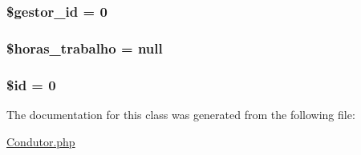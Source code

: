 \subsubsection[{\$gestor\+\_\+id}]{\setlength{\rightskip}{0pt plus 5cm}\$gestor\+\_\+id = 0}\label{class_condutor_a0a417a750596945da402317f18bc0d1c}
\hypertarget{class_condutor_aacf4107d2082c24e18c17ecdb542c16a}{}
\subsubsection[{\$horas\+\_\+trabalho}]{\setlength{\rightskip}{0pt plus 5cm}\${\bf horas\+\_\+trabalho} = null}\label{class_condutor_aacf4107d2082c24e18c17ecdb542c16a}
\hypertarget{class_condutor_ae97941710d863131c700f069b109991e}{}
\subsubsection[{\$id}]{\setlength{\rightskip}{0pt plus 5cm}\$id = 0}\label{class_condutor_ae97941710d863131c700f069b109991e}


The documentation for this class was generated from the following file\+:\begin{DoxyCompactItemize}
\item 
\hyperlink{_condutor_8php}{Condutor.\+php}\end{DoxyCompactItemize}
